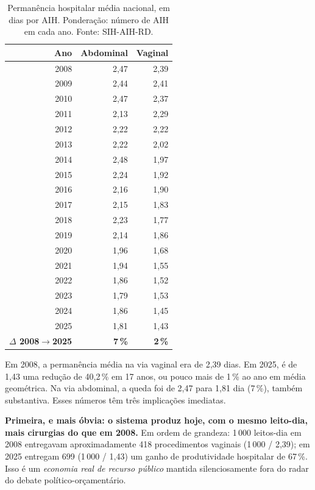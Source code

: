 \documentclass[12pt,a4paper,oneside]{article}
\begin{document}
\begin{table}[H]
\centering
\caption{Permanência hospitalar média nacional, em dias por AIH.
Ponderação: número de AIH em cada ano. Fonte: SIH-AIH-RD.}
\label{tab:nat-perm}
\small
\begin{tabular}{rrr}
\toprule
\textbf{Ano} & \textbf{Abdominal} & \textbf{Vaginal} \\
\midrule
2008 & 2{,}47 & 2{,}39 \\
2009 & 2{,}44 & 2{,}41 \\
2010 & 2{,}47 & 2{,}37 \\
2011 & 2{,}13 & 2{,}29 \\
2012 & 2{,}22 & 2{,}22 \\
2013 & 2{,}22 & 2{,}02 \\
2014 & 2{,}48 & 1{,}97 \\
2015 & 2{,}24 & 1{,}92 \\
2016 & 2{,}16 & 1{,}90 \\
2017 & 2{,}15 & 1{,}83 \\
2018 & 2{,}23 & 1{,}77 \\
2019 & 2{,}14 & 1{,}86 \\
2020 & 1{,}96 & 1{,}68 \\
2021 & 1{,}94 & 1{,}55 \\
2022 & 1{,}86 & 1{,}52 \\
2023 & 1{,}79 & 1{,}53 \\
2024 & 1{,}86 & 1{,}45 \\
2025 & 1{,}81 & 1{,}43 \\
\midrule
\textbf{$\Delta$ 2008$\rightarrow$2025} & \textbf{\textendash 26{,}7\,\%} & \textbf{\textendash 40{,}2\,\%} \\
\bottomrule
\end{tabular}
\end{table}

Em 2008, a permanência média na via vaginal era de 2{,}39 dias.
Em 2025, é de 1{,}43 \textemdash{} uma redução de 40{,}2\,\% em
17 anos, ou pouco mais de 1\,\% ao ano em média geométrica. Na
via abdominal, a queda foi de 2{,}47 para 1{,}81 dia
(7\,\%), também substantiva. Esses números têm
três implicações imediatas.

\textbf{Primeira, e mais óbvia: o sistema produz hoje, com o
mesmo leito-dia, mais cirurgias do que em 2008.} Em ordem de
grandeza: 1\,000 leitos-dia em 2008 entregavam aproximadamente
418 procedimentos vaginais (1\,000 / 2{,}39); em 2025 entregam
699 (1\,000 / 1{,}43) \textemdash{} um ganho de produtividade
hospitalar de 67\,\%. Isso é um \textit{economia real de recurso
público} mantida silenciosamente fora do radar do debate
político-orçamentário.
\end{document}

